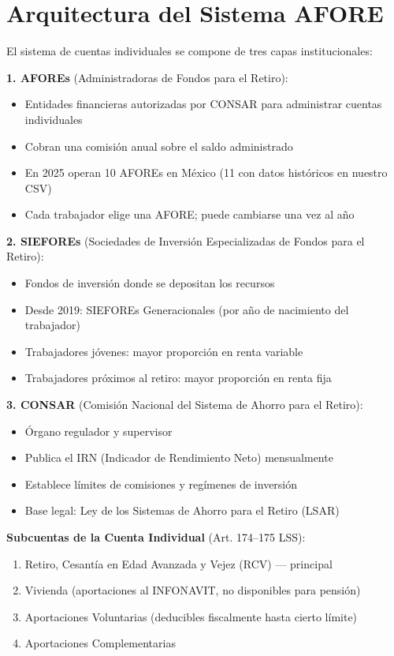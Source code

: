\documentclass[11pt,a4paper]{report}
\begin{document}
\section{Arquitectura del Sistema AFORE}

\begin{tcolorbox}[colback=blue!5!white, colframe=blue!75!black, title=\textbf{Definici\'on Formal}]
El sistema de cuentas individuales se compone de tres capas institucionales:

\textbf{1. AFOREs} (Administradoras de Fondos para el Retiro):
\begin{itemize}[nosep]
\item Entidades financieras autorizadas por CONSAR para administrar cuentas individuales
\item Cobran una comisi\'on anual sobre el saldo administrado
\item En 2025 operan 10 AFOREs en M\'exico (11 con datos hist\'oricos en nuestro CSV)
\item Cada trabajador elige una AFORE; puede cambiarse una vez al a\~no
\end{itemize}

\textbf{2. SIEFOREs} (Sociedades de Inversi\'on Especializadas de Fondos para el Retiro):
\begin{itemize}[nosep]
\item Fondos de inversi\'on donde se depositan los recursos
\item Desde 2019: SIEFOREs Generacionales (por a\~no de nacimiento del trabajador)
\item Trabajadores j\'ovenes: mayor proporci\'on en renta variable
\item Trabajadores pr\'oximos al retiro: mayor proporci\'on en renta fija
\end{itemize}

\textbf{3. CONSAR} (Comisi\'on Nacional del Sistema de Ahorro para el Retiro):
\begin{itemize}[nosep]
\item \'Organo regulador y supervisor
\item Publica el IRN (Indicador de Rendimiento Neto) mensualmente
\item Establece l\'imites de comisiones y reg\'imenes de inversi\'on
\item Base legal: Ley de los Sistemas de Ahorro para el Retiro (LSAR)
\end{itemize}

\textbf{Subcuentas de la Cuenta Individual} (Art. 174--175 LSS):
\begin{enumerate}[nosep]
\item Retiro, Cesant\'ia en Edad Avanzada y Vejez (RCV) --- principal
\item Vivienda (aportaciones al INFONAVIT, no disponibles para pensi\'on)
\item Aportaciones Voluntarias (deducibles fiscalmente hasta cierto l\'imite)
\item Aportaciones Complementarias
\end{enumerate}
\end{tcolorbox}
\end{document}
